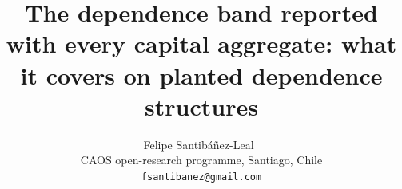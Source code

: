 \documentclass[11pt]{article}
\title{The dependence band reported with every capital aggregate: what it covers on planted dependence structures}
\author{Felipe Santib\'a\~nez-Leal~\orcidlink{0000-0002-0150-3246}\\
\small CAOS open-research programme, Santiago, Chile\\
\small \texttt{fsantibanez@gmail.com}}
\date{\docdate}
\begin{document}
\maketitle
\headerblock

\begin{abstract}

\end{abstract}
















\end{document}
